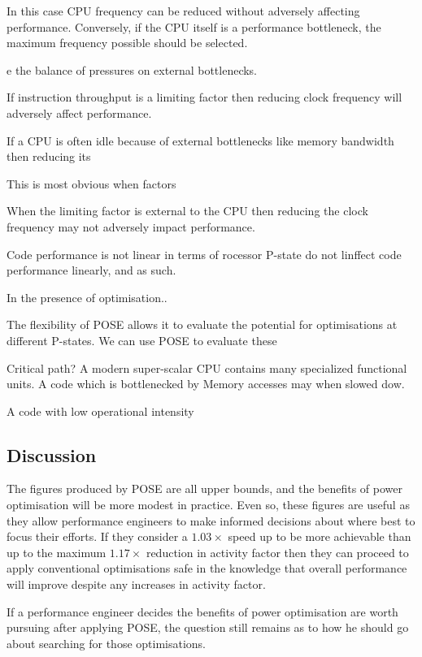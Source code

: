 In this case CPU frequency can be reduced without adversely affecting performance.
Conversely, if the CPU itself is a performance bottleneck, the maximum frequency possible should be selected.



e the balance of pressures on external bottlenecks.


If instruction throughput is a limiting factor then reducing clock frequency will adversely affect performance.


If a CPU is often idle because of external bottlenecks
like memory bandwidth then reducing its 


This is most obvious when factors





When the limiting factor is external to the CPU then reducing the clock frequency may not adversely impact performance.



Code performance is not linear in terms of rocessor P-state do not linffect code performance linearly, and as such.

In the presence of optimisation..

The flexibility of POSE allows it to evaluate the potential for optimisations at different P-states.
We can use POSE to evaluate these

Critical path?  A modern super-scalar CPU contains many specialized functional units. A code which is bottlenecked by Memory accesses may when slowed dow.

A code with low operational intensity

\subsection{Discussion}


The figures produced by POSE are all upper bounds, and the benefits of power optimisation will be more modest in practice. Even so, these figures are useful as they allow performance engineers to make informed decisions about where best to focus their efforts. If they consider a $1.03 \times$ speed up to be more achievable than up to the maximum $1.17\times$ reduction in activity factor then they can proceed to apply conventional optimisations safe in the knowledge that overall performance will improve despite any increases in activity factor.

If a performance engineer decides the benefits of power optimisation are worth pursuing after applying POSE, the question still remains as to how he should go about searching for those optimisations.
